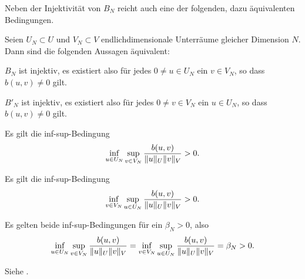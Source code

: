 Neben der Injektivität von $B_{N}$ reicht auch eine der folgenden, dazu äquivalenten Bedingungen.

\begin{Satz}
\label{satz:grb:gv:aequivalente_bedingungen_zu_bijektiv}
    Seien $U_{N} \subset U$ und $V_{N} \subset V$ endlichdimensionale Unterräume gleicher Dimension $N$.
    Dann sind die folgenden Aussagen äquivalent:
    \begin{thmenumerate}
        \item\label{punkt:grb:gv:aequivalente_bedingungen_zu_bijektiv_1} $B_{N}$ ist injektiv, es existiert also für jedes $0 \neq u \in U_{N}$ ein $v \in V_{N}$, so dass $b(u, v) \neq 0$ gilt.
        \item\label{punkt:grb:gv:aequivalente_bedingungen_zu_bijektiv_2} $B'_{N}$ ist injektiv, es existiert also für jedes $0 \neq v \in V_{N}$ ein $u \in U_{N}$, so dass $b(u, v) \neq 0$ gilt.
        \item\label{punkt:grb:gv:aequivalente_bedingungen_zu_bijektiv_3} Es gilt die inf-sup-Bedingung
            \begin{equation}
                \inf_{u \in U_{N}} \sup_{v \in V_{N}} \frac{b(u, v)}{\lVert u\rVert_{U} \lVert v\rVert_{V}} > 0.
            \end{equation}
        \item\label{punkt:grb:gv:aequivalente_bedingungen_zu_bijektiv_4} Es gilt die inf-sup-Bedingung
            \begin{equation}
                \inf_{v \in V_{N}} \sup_{u \in U_{N}} \frac{b(u, v)}{\lVert u\rVert_{U} \lVert v\rVert_{V}} > 0.
            \end{equation}
        \item\label{punkt:grb:gv:aequivalente_bedingungen_zu_bijektiv_5} Es gelten beide inf-sup-Bedingungen für ein $\beta_{N} > 0$, also
            \begin{equation}
                \inf_{u \in U_{N}} \sup_{v \in V_{N}} \frac{b(u, v)}{\lVert u\rVert_{U} \lVert v\rVert_{V}}
                = \inf_{v \in V_{N}} \sup_{u \in U_{N}} \frac{b(u, v)}{\lVert u\rVert_{U} \lVert v\rVert_{V}}
                = \beta_{N} > 0.
            \end{equation}
    \end{thmenumerate}

    \begin{Beweis}
        Siehe \cite[Proposition 3.1]{Nochetto:2009il}.
    \end{Beweis}
\end{Satz}

